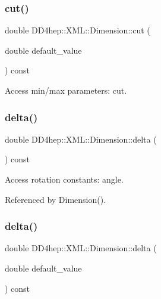 \subsubsection{\texorpdfstring{cut()}{cut()}\hspace{0.1cm}{\footnotesize\ttfamily [2/2]}}
{\footnotesize\ttfamily double D\+D4hep\+::\+X\+M\+L\+::\+Dimension\+::cut (\begin{DoxyParamCaption}\item[{double}]{default\+\_\+value }\end{DoxyParamCaption}) const}



Access min/max parameters\+: cut. 

\hypertarget{struct_d_d4hep_1_1_x_m_l_1_1_dimension_adc94bde2c46bd2e31c683362faa5fd19}{}\label{struct_d_d4hep_1_1_x_m_l_1_1_dimension_adc94bde2c46bd2e31c683362faa5fd19} 
\subsubsection{\texorpdfstring{delta()}{delta()}\hspace{0.1cm}{\footnotesize\ttfamily [1/2]}}
{\footnotesize\ttfamily double D\+D4hep\+::\+X\+M\+L\+::\+Dimension\+::delta (\begin{DoxyParamCaption}{ }\end{DoxyParamCaption}) const}



Access rotation constants\+: angle. 



Referenced by Dimension().

\hypertarget{struct_d_d4hep_1_1_x_m_l_1_1_dimension_aba39a53221f8c9e76038fd009ebe20e4}{}\label{struct_d_d4hep_1_1_x_m_l_1_1_dimension_aba39a53221f8c9e76038fd009ebe20e4} 
\subsubsection{\texorpdfstring{delta()}{delta()}\hspace{0.1cm}{\footnotesize\ttfamily [2/2]}}
{\footnotesize\ttfamily double D\+D4hep\+::\+X\+M\+L\+::\+Dimension\+::delta (\begin{DoxyParamCaption}\item[{double}]{default\+\_\+value }\end{DoxyParamCaption}) const}



